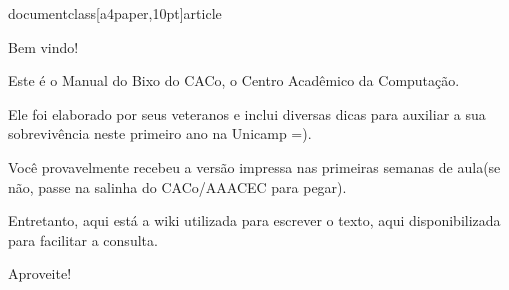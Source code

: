 documentclass[a4paper,10pt]{article}
\usepackage{fullpage}
\usepackage[scaled=0.85]{helvet}
\renewcommand{\familydefault}{\sfdefault}
\usepackage{ucs}
\usepackage[utf8x]{inputenc}
\usepackage[brazil]{babel}
\usepackage[T1]{fontenc}
\usepackage[pdftex]{graphicx}
\usepackage{url,color,float}
\usepackage{multirow}
\usepackage{hyperref}
\hypersetup{
    colorlinks=false,
    pdfborder=0 0 0
}
\usepackage{tabularx}




Bem vindo!

Este é o Manual do Bixo do CACo, o Centro Acadêmico da Computação.

Ele foi elaborado por seus veteranos e inclui diversas dicas para auxiliar a sua
sobrevivência neste primeiro ano na Unicamp =).

Você provavelmente recebeu a versão impressa nas primeiras semanas de aula(se
não, passe na salinha do CACo/AAACEC para pegar).

Entretanto, aqui está a wiki utilizada para escrever o texto, aqui
disponibilizada para facilitar a consulta.

Aproveite!

